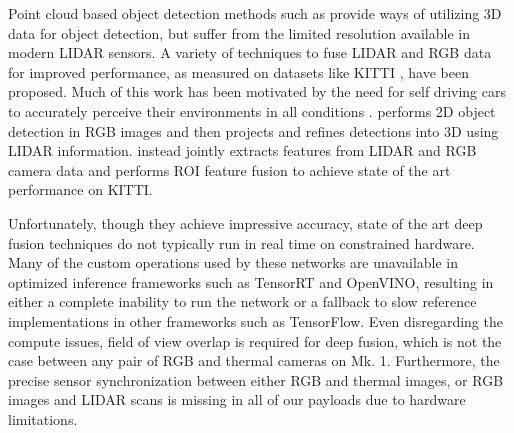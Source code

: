 Point cloud based object detection methods such as \cite{beltran2018birdnet, li2016vehicle} provide ways of utilizing 3D data for object detection, but suffer from the limited resolution available in modern LIDAR sensors. A variety of techniques to fuse LIDAR and RGB data for improved performance, as measured on datasets like KITTI \cite{Geiger2013IJRR}, have been proposed. Much of this work has been motivated by the need for self driving cars to accurately perceive their environments in all conditions \cite{feng2019deep}. \cite{qi2018frustum} performs 2D object detection in RGB images and then projects and refines detections into 3D using LIDAR information. \cite{liang2019multi} instead jointly extracts features from LIDAR and RGB camera data and performs ROI feature fusion to achieve state of the art performance on KITTI.

Unfortunately, though they achieve impressive accuracy, state of the art deep fusion techniques do not typically run in real time on constrained hardware. Many of the custom operations used by these networks are unavailable in optimized inference frameworks such as TensorRT and OpenVINO, resulting in either a complete inability to run the network or a fallback to slow reference implementations in other frameworks such as TensorFlow. Even disregarding the compute issues, field of view overlap is required for deep fusion, which is not the case between any pair of RGB and thermal cameras on Mk. 1. Furthermore, the precise sensor synchronization between either RGB and thermal images, or RGB images and LIDAR scans is missing in all of our payloads due to hardware limitations.